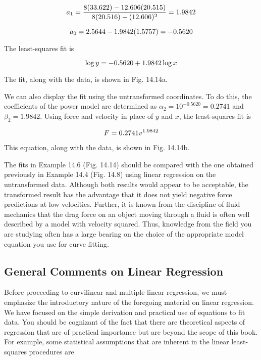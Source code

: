 \documentclass[../main.tex]{subfiles}
\begin{document}
\begin{example}
	\begin{equation}
		\notag
		a_1 = \frac{8(33.622) - 12.606(20.515)}{8(20.516) - (12.606)^2} = 1.9842
	\end{equation}

	\begin{equation}
		\notag
		a_0 = 2.5644 - 1.9842(1.5757) = -0.5620
	\end{equation}

	\noindent The least-squares fit is

	\begin{equation}
		\notag
		\log y = -0.5620 + 1.9842 \log x
	\end{equation}

	\noindent The fit, along with the data, is shown in Fig. 14.14a.

	We can also display the fit using the untransformed coordinates. To do this, the coefficients of the power model are determined as $\alpha_2 = 10^{-0.5620} = 0.2741$ and $\beta_2 = 1.9842$. Using force and velocity in place of $y$ and $x$, the least-squares fit is

	\begin{equation}
		\notag
		F = 0.2741 v ^ {1.9842}		
	\end{equation}

	\noindent This equation, along with the data, is shown in Fig. 14.14b.
\end{example}


The fits in Example 14.6 (Fig. 14.14) should be compared with the one obtained previously in Example 14.4 (Fig. 14.8) using linear regression on the untransformed data. Although both results would appear to be acceptable, the transformed result has the advantage that it does not yield negative force predictions at low velocities. Further, it is known from the discipline of fluid mechanics that the drag force on an object moving through a fluid is often well described by a model with velocity squared. Thus, knowledge from the field you are studying often has a large bearing on the choice of the appropriate model equation you use for curve fitting.


\label{cha:cha_P_14_4_1}
\subsection{General Comments on Linear Regression}

\noindent Before proceeding to curvilinear and multiple linear regression, we must emphasize the introductory nature of the foregoing material on linear regression. We have focused on the simple derivation and practical use of equations to fit data. You should be cognizant of the fact that there are theoretical aspects of regression that are of practical importance but are beyond the scope of this book. For example, some statistical assumptions that are inherent in the linear least-squares procedures are
\end{document}
